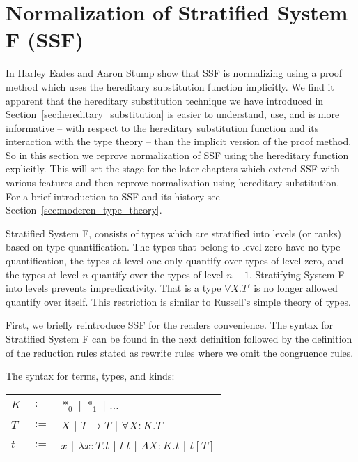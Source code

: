 \section{Normalization of Stratified System F (SSF)}
\label{subsec:normalization_stratified_system_f}
In \cite{Eades:2010} Harley Eades and Aaron Stump show that
SSF is
normalizing using a proof method which uses the hereditary
substitution function implicitly.  We find it apparent that the
hereditary substitution technique we have introduced in
Section~\ref{sec:hereditary_substitution} is easier to understand,
use, and is more informative -- with respect to the hereditary
substitution function and its interaction with the type theory -- than
the implicit version of the proof method.  So in this section we
reprove normalization of SSF using the hereditary function explicitly.
This will set the stage for the later chapters which extend SSF with
various features and then reprove normalization using hereditary
substitution.  For a brief introduction to SSF and its history see
Section~\ref{sec:moderen_type_theory}.

Stratified System F, consists of types which are stratified into
levels (or ranks) based on
type-quantification.  The types that belong
to level zero have no type-quantification, the types at level one only
quantify over types of level zero, and the types at level $n$ quantify
over the types of level $n-1$.  Stratifying System F into levels
prevents impredicativity.  That is a type $\forall X.T'$ is no
longer allowed quantify over itself.  This restriction is similar to
Russell's simple theory of types.

First, we briefly reintroduce SSF for the readers convenience.  The
syntax for Stratified System F can be found in the next definition
followed by the definition of the reduction rules stated as rewrite
rules where we omit the congruence rules.
\begin{definition}
  \label{def:syntax_ssf}
  The syntax for terms, types, and kinds:
  \begin{center}
    \begin{tabular}{lll}
      $K$ & $:=$ & $*_0$ $|$ $*_1$             $|$ $\ldots$\\
      $T$ & $:=$ & $X$   $|$ $T \rightarrow T$ $|$ $\forall X:K.T$\\
      $t$ & $:=$ & $x$   $|$ $\lambda x:T.t$   $|$ $t\ t$ $|$ $\Lambda X:K.t$ $|$ $t[T]$\\
    \end{tabular}
  \end{center}
\end{definition}

